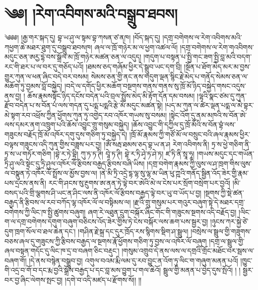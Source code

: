\setcounter{footnote}{0} 
\chapter{༄༅། །རེག་འབིགས་མའི་བསྒྲུབ་ཐབས།}༄༅༅། །རྒྱ་གར་སྐད་དུ། བྷ་ཡ་ཤུ་ལ་སྟམ་བྷ་ཀསན་ཙ་ནཁ། །བོད་སྐད་དུ། །དགྲ་བགེགས་ལ་རེག་འབིགས་མའི་ཀཕྱག་ཆེ་མཐར་ཐུག་དུ་བསྒྲུབ་ཐབསཁ། ཞལ་ལ་ཁྲོ་གཉེར་མ་ལ་ཕྱག་འཚལ་ལོ། །དགྲ་བགེགས་ལ་རེག་གའབིགས་མདུང་ཅན་ཨརྱ་དྷེ་བས་སྒྲོལ་མ་ཁྲོ་གཉེར་མཚན་ཅན་ལ་འདུད། །གདུག་པ་བསྟན་པ་སྤྱི་གང་ཟག་སྤྱི་བླ་མའི་བདག་རང་གི་ཐར་པ་ལ་བར་དུ་གཅོད་པའོ། །ཐམས་ཅད་གཞོམ་ཕྱིར་དེ་སྒྲུབ་ཡང་དག་བྲི། །སྔོན་པ་ཐོག་མེད་མར་མ་བྱས་གྱུར་ཀུན་ལ་ཕན་ཞིང་བདེ་བར་བསམ། སེམས་ཅན་གྱི་ནང་ནས་གདུག་ལྡན་སྙིང་རྗེ་མེད་པ་གནོད་སེམས་ཅན་ལ་མཆོག་ཏུ་བྱམས་བློ་བསྐྱེད། །བདེ་ལ་དགོད་ཕྱིར་མཆོག་བསྔགས་གནས་གནས་སུ་ཁྲོ་མོ་ཉིད་བསྐྱེད་གསང་འདུས་ནས་བྱ། ། ཆོས་རྣམསསྟོང་ཉིད་དངོས་བདེན་པའི་བྲལ་སྤྲོས་མེད་མི་རྟོག་དོན་དམ་བསམ། །ལྷའི་སྣང་ཙམ་དུ་ཀུན་རྫོབ་བདེན་པ་ས་བོན་པཾ་ལས་གདན་དུ་པདྨ་པདྨའི་རྩེ་མོ་མདུང་མཚན་སྟེ། །པད་མ་ཀུན་ལ་ཚེར་ལྡན་པདྨ་ལ་མེ་བྷར་མེ་སྟག་རབ་འཕྲོས་ཀྱིན་ཕྱོགས་ཀུན་ཏུ་འགྱེད་རབ་འཁོར་གཡས་སུ་བསམ། །སྟེང་འོག་དུ་ནམ་མཁའི་ས་བོན་ཨེ་ལས་དམར་ནག་འཁྲུག་པའི་ཆོས་འབྱུང་གྲུ་གསུམ་བསྐྱེད། །ཆོས་འབྱུང་གི་དཀྱིལ་དུ་ཁྲོ་མོའི་ས་བོན་བྷཾ་ལས་གཟུངས་བརྗོད་ཁྲོ་མོ་འཁོར་དགུ་དུས་གཅིག་ཏུ་བསྐྱེད་དེ། །ཁྲོ་མོ་རྣམས་ཀྱི་གཙོ་མོ་ལ་བསྲུང་བའི་ཞལ་རྣམས་ཕྱིར་བལྟས་གཟུངས་འདི་ཀུན་གྱིས་བཟླས་པར་བྱ། །ཨོཾ་སརྦ་ཐམས་ཅད་བྷ་ཡ་ན་ཤ རེག་འབིགས་ནི། ཏྲ་ས་ཕྱེ་གཅིག་ནི་ཏྲ་ས་ཡ་གཏོར་གཅིག །བྷེ་ར་ཏེ་བྷྲི། ཀུ་ཏ་ཏ་ཊི། བཱེ་ཏ་ཊི། བྷེ་ར་ཏི་ཤྭེ་ཏ་ཤེ་ཏ། ཛ་ཏི་ནི་སྲཱ་ཧཱ། །གཡས་མདུང་དང་གཡོན་ཏྲི་ཤུ་ལའི་སྟེང་དུ་ཏྲི་ཤུལ་འཁོར་ལོ་རྩིབས་བརྒྱད་རྩིབས་བཞི་ཡིས། །དགྲ་བགེག་རྣམས་ཀྱི་ལུས་ལ་ཤ་ཁྲག་གིས་ལུས་ལ་བསྣུན་ཏེ་འཁོར་ལོ་སྤྲོས་ལ་མྱོས་བྱས་ལ། །ནེ་མི་ཏྲི་འདྲེ་དྷ་ལྷ་སུ་ལྷ་མ་ཡིན་ཕུ་ཀྵའི་གནོད་སྦྱིན་འོད་ཟེར་གྱི་རྣམ་པས་དྲངས་ནས་ནི། རང་གི་ཤངས་སུ་རྔུགས་ཨ་ནན་ཏེ་ལྟེ་བར་ཨེའི་མེ་ལ་ངེས་པར་སྲོག་བསྲེག་པར་བྱའོ། །མི་བསད་པའི་གྲི་ལྕགས་ཤི་ཡང་ན་ཤིང་ལས་ནི་འཁོར་ལོ་རྩིབས་བརྒྱད་ལྟེ་བར་ཡུ་བ་ཡོད་པ་བྱ། །སྔགས་ཀྱི་སྡེ་ཚན་བརྒྱད་ནི་རྩིབས་ལ་རབ་བཀོད་ལྷ་འཁོར་ལོ་ལ་བསྟིམས་ལ། །རྫའི་གྲུ་གསུམ་པར་གའུར་བཞུག་སྟེ་དེ་མཐར་དགྲ་བགེགས་ཀྱི་ལིང་ཁ་སྤྱི་ཚུགས་བཞུག། ཞག་རེ་ལཐུན་དྲུག་བསྐོར་ཞིང་གོང་གི་གཟུངས་སྔགས་འདི་བརྗོད་བྱ། །ལིང་ག་ལ་དགྲ་བགེགས་དགུག་བཞུག་བཅིངས་འོད་ཟེར་གྱིས་ཏེ་ངེས་བསྐོར་ལས་ཆག་པས་སྦྱར་བྱ། །ཉུངས་ཀར་སྐྱེ་ཙེ་དུག་ཁྲག་སོལ་བ་ཐལ་ཆེན་དང་། །གཤིན་རྗེ་སྐྲ་དང་དུར་ཁྲོད་རས་སྙིགས་སྡིག་ཤ་སྦྲུལ། །བསྲེས་ལ་སྦྲུལ་གྱི་གཟུགས་བཅས་ཞལ་དུ་གཟུངས་ཀྱི་རྩིབས་བརྒྱད་ལ་སྔགས་རྣོ་ཕྱོགས་གཅིག་ཏུ་བྱས་ལ་འཁོར་ལོ་བཞུག །དགྲ་ལ་སྦྲུལ་གྱི་ཞལ་བསྟན་གདོང་དུ་ལིང་ཁ་དྲ་བ་བཞག་ཅིང་བརྡུང་། །གསུམ་འགྲུབ་དེ་ནས་ལས་ལ་དགྲའི་གྲོང་མཐོང་བར་སྦས་ལ་བཞག་གོ། །དེ་ནས་བསྙེན་བསྒྲུབ་བྱ། འགུལ་བའམ་རྨི་ལམ་དུ་རབ་བྱུང་ན་འོག་ཏུ་ལིང་ག་གཞུག་མནན་པའོ། །ཁྱུང་གི་འདྲ་བ་གོ་བ་དང་རྨ་བྱའི་སྒྲོས་བརྒྱད་པ་དང་བླ་མས་བྱུག་པ་གལ་ཆེའོ། སྦྲུལ་གྱི་མནན་པ་བྱེད་དུས་སྤོའོ། ། ། སྦྱར་བར་བྱ་ཞིང་ལེགས་སྤང་བྱ། །དགེ་བ་འདི་མཛད་པ་རྫོགས་སོ།། །།